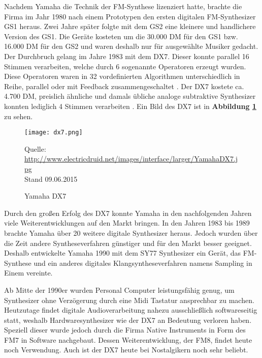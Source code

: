 Nachdem Yamaha die Technik der FM-Synthese lizenziert hatte, brachte die Firma im Jahr 1980 nach einem Prototypen den ersten digitalen FM-Synthesizer GS1 heraus. Zwei Jahre später folgte mit dem GS2 eine kleinere und handlichere Version des GS1. Die Geräte kosteten um die 30.000 DM für den GS1 bzw. 16.000 DM für den GS2 und waren deshalb nur für ausgewählte Musiker gedacht. Der Durchbruch gelang im Jahre 1983 mit dem DX7. Dieser konnte parallel 16 Stimmen verarbeiten, welche durch 6 sogenannte Operatoren erzeugt wurden. Diese Operatoren waren in 32 vordefinierten Algorithmen unterschiedlich in Reihe, parallel oder mit Feedback zusammengeschaltet \cite[S. 11]{dx7manual}. Der DX7 kostete ca. 4.700 DM, preislich ähnliche und damals übliche analoge subtraktive Synthesizer konnten lediglich 4 Stimmen verarbeiten \cite{fmGS1}. Ein Bild des DX7 ist in \textbf{Abbildung \ref{fig:dx7}} zu sehen.

 \begin{figure} [ht]
\centering
  \texttt{[image: dx7.png]}
\caption{Yamaha DX7}
\label{fig:dx7}
Quelle: \url{http://www.electricdruid.net/images/interface/larger/YamahaDX7.jpg}
\\Stand 09.06.2015
\end{figure}

Durch den großen Erfolg des DX7 konnte Yamaha in den nachfolgenden Jahren viele Weiterentwicklungen auf den Markt bringen. In den Jahren 1983 bis 1989 brachte Yamaha über 20 weitere digitale Synthesizer heraus. Jedoch wurden über die Zeit andere Syntheseverfahren günstiger und für den Markt besser geeignet. Deshalb entwickelte Yamaha 1990 mit dem SY77 Synthesizer ein Gerät, das FM-Synthese und ein anderes digitales Klangsyntheseverfahren namens Sampling in Einem vereinte.\cite{fmGS1}

Ab Mitte der 1990er wurden Personal Computer leistungsfähig genug, um Synthesizer ohne Verzögerung durch eine Midi Tastatur ansprechbar zu machen. Heutzutage findet digitale Audioverarbeitung nahezu ausschließlich softwareseitig statt, weshalb Hardwaresynthesizer wie der DX7 an Bedeutung verloren haben. Speziell dieser wurde jedoch durch die Firma Native Instruments in Form des FM7 in Software nachgebaut. Dessen Weiterentwicklung, der FM8, findet heute noch Verwendung. Auch ist der DX7 heute bei Nostalgikern noch sehr beliebt.\cite{fmGS1}